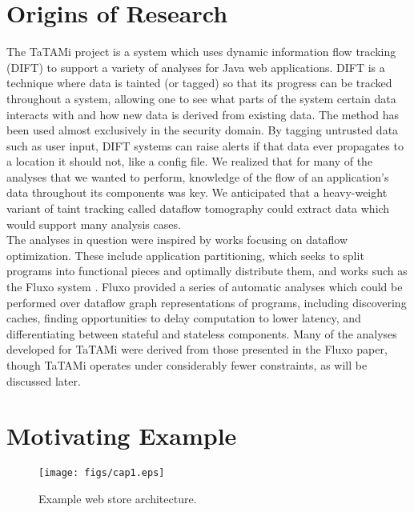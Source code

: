 \documentclass[msc,oneside]{ubcthesis}
\begin{document}
	
\section{Origins of Research}
		
The TaTAMi project is a system which uses dynamic information flow tracking (DIFT) to support a variety of analyses for Java web applications.  DIFT is a technique where data is tainted (or tagged) so that its progress can be tracked throughout a system, allowing one to see what parts of the system certain data interacts with and how new data is derived from existing data. The method has been used almost exclusively in the security domain. By tagging untrusted data such as user input, DIFT systems can raise alerts if that data ever propagates to a location it should not, like a config file. We realized that for many of the analyses that we wanted to perform, knowledge of the flow of an application's data throughout its components was key. We anticipated that a heavy-weight variant of taint tracking called dataflow tomography could extract data which would support many analysis cases.\\

The analyses in question were inspired by works focusing on dataflow optimization. These include application partitioning, which seeks to split programs into functional pieces and optimally distribute them, and works such as the Fluxo system \cite{Kiciman2010}. Fluxo provided a series of automatic analyses which could be performed over dataflow graph representations of programs, including discovering caches, finding opportunities to delay computation to lower latency, and differentiating between stateful and stateless components. Many of the analyses developed for TaTAMi were derived from those presented in the Fluxo paper, though TaTAMi operates under considerably fewer constraints, as will be discussed later.	
	
\section{Motivating Example}

\begin{figure}[ht]
  \begin{center}
    \texttt{[image: figs/cap1.eps]}
    \caption[Example web store architecture.]{\label{fig:cap1} Example web store architecture.}
  \end{center}
\end{figure}
\end{document}
